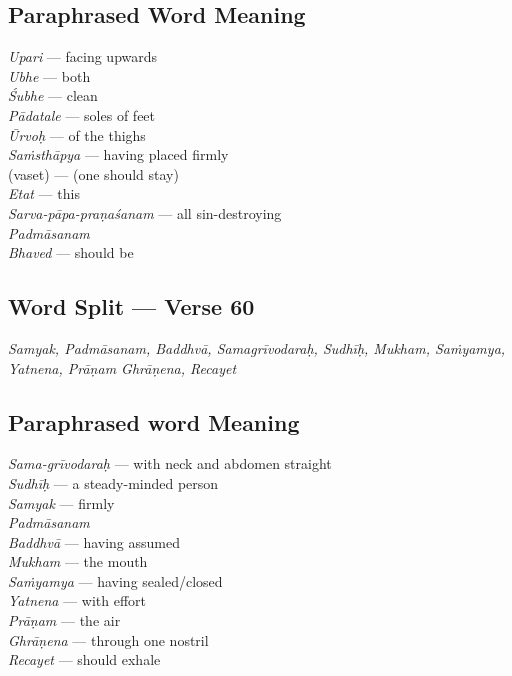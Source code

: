 \subsection*{Paraphrased Word Meaning}


\begin{multicols}{2}
\textit{Upari} --- facing upwards \\
\textit{Ubhe} --- both \\
\textit{Śubhe} --- clean\\ 
\textit{Pādatale} --- soles of feet \\
\textit{Ūrvoḥ} ---  of the thighs \\
\textit{Saṁsthāpya} --- having placed firmly \\
(vaset) --- (one should stay)\\
\textit{Etat} --- this \\
\textit{Sarva-pāpa-praṇaśanam} --- all sin-destroying \\
\textit{Padmāsanam} \\
\textit{Bhaved} --- should be
\end{multicols}

\subsection*{Word Split --- Verse 60}


\textit{Samyak, Padmāsanam, Baddhvā, Samagrīvodaraḥ, Sudhīḥ, Mukham, Saṁyamya, Yatnena, Prāṇam Ghrāṇena, Recayet}

\subsection*{Paraphrased word Meaning}


\begin{multicols}{2}
\textit{Sama-grīvodaraḥ} --- with neck and abdomen straight \\
\textit{Sudhīḥ}  --- a steady-minded person \\
\textit{Samyak} --- firmly \\
\textit{Padmāsanam} \\
\textit{Baddhvā} --- having assumed \\
\textit{Mukham} --- the mouth \\
\textit{Saṁyamya} --- having sealed/closed \\
\textit{Yatnena} --- with effort \\
\textit{Prāṇam} --- the air \\
\textit{Ghrāṇena} --- through one nostril \\
\textit{Recayet} --- should exhale 
\end{multicols}

